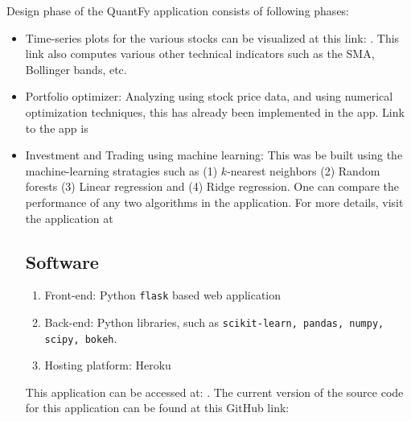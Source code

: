 \documentclass[12pt]{article}
\begin{document}
Design phase of the QuantFy application consists of following phases:
\begin{itemize}
\item Time-series plots for the various stocks can be visualized at this link: \href{http://quantfy.herokuapp.com/price_plot}{\color{blue}{Price plot}} \cite{pp}. This link also computes various other technical indicators such as the SMA, Bollinger bands, etc.
\item Portfolio optimizer: Analyzing using stock price data, and using numerical optimization techniques, this has already been implemented in the app. Link to the app is \href{http://quantfy.herokuapp.com/portfolio}{\color{blue}{\bf Portfolio optimizer}} \cite{po}

\item Investment and Trading using machine learning: This was be built using the machine-learning stratagies such as (1) $k$-nearest neighbors (2) Random forests (3) Linear regression  and (4) Ridge regression. One can compare the performance of any two algorithms in the application. For more details, visit the application at \href{http://quantfy.herokuapp.com/mlModels}{\color{blue}{\bf ML models}}

\subsection{Software}
\begin{enumerate}
\item Front-end: Python \texttt{flask} based web application
\item Back-end: Python libraries, such as \texttt{scikit-learn, pandas, numpy, scipy, bokeh}.
\item Hosting platform: Heroku
\end{enumerate}

This  application can be accessed at: \href{http://quantfy.herokuapp.com}{\color{blue}{\bf QuantFy}} \cite{qfy}. The current version of the source code for this application can be found at this GitHub link: \href{https://github.com/beegeesquare/QuantFy}{\color{blue}{\bf Source code}} \cite{sc}


\end{itemize}
\end{document}

